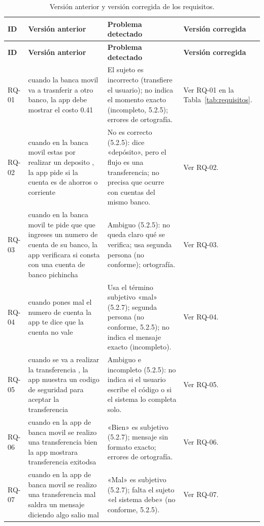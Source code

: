 \documentclass[11pt,a4paper]{article}
\begin{document}
{\footnotesize
\setlength{\tabcolsep}{3pt}
\renewcommand{\arraystretch}{1.25}
\begin{longtable}{>{\raggedright\arraybackslash}p{1.2cm}
                  >{\raggedright\arraybackslash}p{4.6cm}
                  >{\raggedright\arraybackslash}p{3.6cm}
                  >{\raggedright\arraybackslash}p{5.2cm}}
\caption{Versión anterior y versión corregida de los requisitos.}\label{tab:autoeval}\\
\toprule
\textbf{ID} & \textbf{Versión anterior} & \textbf{Problema detectado} & \textbf{Versión corregida}\\
\midrule
\endfirsthead
\toprule
\textbf{ID} & \textbf{Versión anterior} & \textbf{Problema detectado} & \textbf{Versión corregida}\\
\midrule
\endhead
RQ-01 & cuando la banca movil va a trasnferir a otro banco, la app debe mostrar el costo 0.41 & El sujeto es incorrecto (transfiere el usuario); no indica el momento exacto (incompleto, 5.2.5); errores de ortografía. & Ver RQ-01 en la Tabla~\ref{tab:requisitos}.\\
RQ-02 & cuando en la banca movil estas por realizar un deposito , la app pide si la cuenta es de ahorros o corriente & No es correcto (5.2.5): dice «depósito», pero el flujo es una transferencia; no precisa que ocurre con cuentas del mismo banco. & Ver RQ-02.\\
RQ-03 & cuando en la banca movil te pide que que ingreses un numero de cuenta de su banco, la app verificara si consta con una cuenta de banco pichincha & Ambiguo (5.2.5): no queda claro qué se verifica; usa segunda persona (no conforme); ortografía. & Ver RQ-03.\\
RQ-04 & cuando pones mal el numero de cuenta la app te dice que la cuenta no vale & Usa el término subjetivo «mal» (5.2.7); segunda persona (no conforme, 5.2.5); no indica el mensaje exacto (incompleto). & Ver RQ-04.\\
RQ-05 & cuando se va a realizar la transferencia , la app muestra un codigo de seguridad para aceptar la transferencia & Ambiguo e incompleto (5.2.5): no indica si el usuario escribe el código o si el sistema lo completa solo. & Ver RQ-05.\\
RQ-06 & cuando en la app de banca movil se realizo una transferencia bien la app mostrara transferencia exitodsa & «Bien» es subjetivo (5.2.7); mensaje sin formato exacto; errores de ortografía. & Ver RQ-06.\\
RQ-07 & cuando en la app de banca movil se realizo una transferencia mal saldra un mensaje diciendo algo salio mal & «Mal» es subjetivo (5.2.7); falta el sujeto «el sistema debe» (no conforme, 5.2.5). & Ver RQ-07.\\

\end{longtable}}
\end{document}
